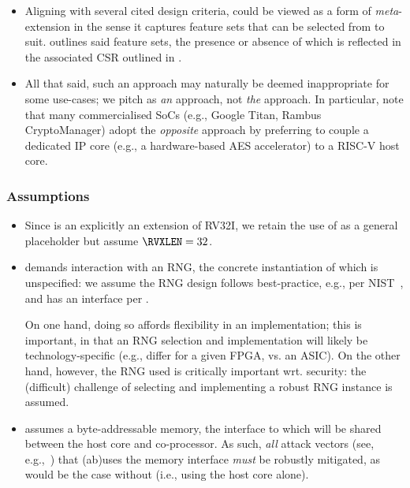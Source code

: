 \begin{itemize}
\begin{itemize}
      \end{itemize}

\item Aligning with several cited design criteria, \XCID could be viewed as 
      a form of {\em meta}-extension in the sense it captures feature sets
      that can be selected from to suit.   outlines 
      said feature sets, the presence or absence of which is reflected in 
      the associated CSR outlined in .

\item All that said, such an approach may naturally be deemed inappropriate 
      for some use-cases; we pitch \XCID as {\em an} approach, not {\em the}
      approach.  In particular, note that many commercialised SoCs 
      (e.g., Google Titan, Rambus CryptoManager) 
      adopt the {\em opposite} approach by preferring to couple a dedicated
      IP core 
      (e.g., a hardware-based AES accelerator) 
      to a RISC-V host core.

\end{itemize}


\subsubsection{Assumptions}

\begin{itemize}

\item Since \XCID is an explicitly an extension of RV32I, we retain the use
      of \RVXLEN as a general placeholder but assume $\RVXLEN = 32$.

\item \XCID demands interaction with an RNG, the concrete instantiation of 
      which is unspecified: we assume the RNG design follows best-practice,
      e.g., per NIST~\cite{SCARV:NIST:SP:800_90a,SCARV:NIST:SP:800_90b,SCARV:NIST:SP:800_90c},
      and has an interface per \cite[Section 6.4]{SCARV:NIST:SP:800_90c}.

      On one hand, doing so affords flexibility in an implementation; this 
      is important, in that an RNG selection and implementation will likely 
      be technology-specific (e.g., differ for a given FPGA, vs. an ASIC).  
      On the other hand, however, the RNG used is critically important wrt. 
      security: the (difficult) challenge of selecting and implementing 
      a robust RNG instance is assumed.

\item \XCID assumes a byte-addressable memory, the interface to which will
      be shared between the host core and co-processor.  As such, {\em all}
      attack vectors
      (see, e.g.,~\cite{SCARV:GYCH:18})
      that (ab)uses the memory interface {\em must} be robustly mitigated, 
      as would be the case without \XCID (i.e., using the host core alone).

\end{itemize}


